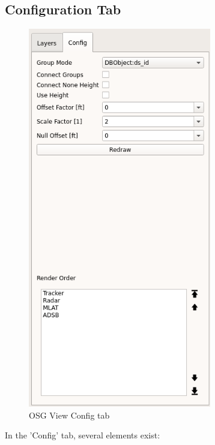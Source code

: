 \subsection{Configuration Tab}
\label{sec:osgview_config}

\begin{figure}[H]
    \hspace*{-2cm}
    \includegraphics[width=8cm,frame]{../screenshots/osgview_config_tab.png}
  \caption{OSG View Config tab}
\end{figure}


In the 'Config' tab, several elements exist:

